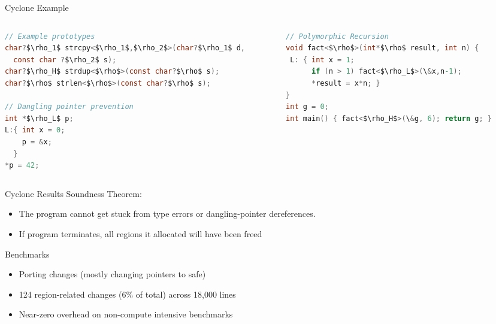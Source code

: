 \documentclass[aspectratio=169]{beamer}
\begin{document}
\begin{frame}[fragile]{Cyclone Example}
\footnotesize{
  \begin{columns}[T]
    \begin{column}{0.48\textwidth}
\begin{lstlisting}[language=C,mathescape,basicstyle={\scriptsize\ttfamily}]
// Example prototypes
char?$\rho_1$ strcpy<$\rho_1$,$\rho_2$>(char?$\rho_1$ d,
  const char ?$\rho_2$ s);
char?$\rho_H$ strdup<$\rho$>(const char?$\rho$ s);
char?$\rho$ strlen<$\rho$>(const char?$\rho$ s);

// Dangling pointer prevention
int *$\rho_L$ p;
L:{ int x = 0;
    p = &x;
  }
*p = 42;
\end{lstlisting}
    \end{column}
%

    \begin{column}{0.48\textwidth}
\begin{lstlisting}[language=C,mathescape,basicstyle={\scriptsize\ttfamily}]
// Polymorphic Recursion
void fact<$\rho$>(int*$\rho$ result, int n) {
 L: { int x = 1;
      if (n > 1) fact<$\rho_L$>(\&x,n-1);
      *result = x*n; }
}
int g = 0;
int main() { fact<$\rho_H$>(\&g, 6); return g; }
\end{lstlisting}
    \end{column}
    \end{columns}
}
%
\end{frame}

\begin{frame}{Cyclone Results}
Soundness Theorem:
    \begin{itemize}
        \item The program cannot get stuck from type errors or dangling-pointer dereferences. 
        \item If program terminates, all regions it allocated will have been freed
    \end{itemize}
Benchmarks
    \begin{itemize}
        \item Porting changes (mostly changing pointers to safe)
        \item 124 region-related changes (6\% of total) across 18,000 lines
        \item Near-zero overhead on non-compute intensive benchmarks %
    \end{itemize}
\end{frame}
\end{document}
